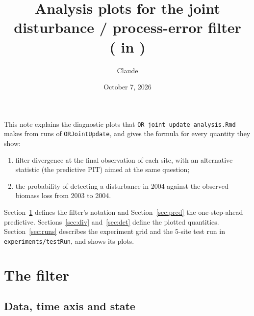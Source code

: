 \documentclass[11pt]{article}
\title{Analysis plots for the joint disturbance / process-error filter\\
       (\code{ORJointUpdate} in \code{OR\_joint\_update2.Rmd})}
\author{Claude}
\date{October 7, 2026}
\newcommand{\code}[1]{\texttt{#1}}
\begin{document}
\maketitle

This note explains the diagnostic plots that \code{OR\_joint\_update\_analysis.Rmd}
makes from runs of \code{ORJointUpdate}, and gives the formula for every quantity they
show:
\begin{enumerate}
  \item filter divergence at the final observation of each site, with an alternative
        statistic (the predictive PIT) aimed at the same question;
  \item the probability of detecting a disturbance in 2004 against the observed biomass
        loss from 2003 to 2004.
\end{enumerate}
Section~\ref{sec:model} defines the filter's notation and Section~\ref{sec:pred} the
one-step-ahead predictive. Sections~\ref{sec:div} and~\ref{sec:det} define the plotted
quantities. Section~\ref{sec:runs} describes the experiment grid and
the 5-site test run in \code{experiments/testRun}, and shows its plots.

\section{The filter}
\label{sec:model}

\subsection{Data, time axis and state}
\end{document}
